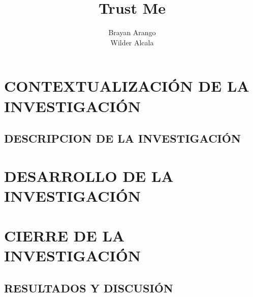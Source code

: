 \documentclass[12pt,letterpaper,oneside]{report}
\title{Trust Me}
\author{{Brayan Arango} \\ {Wilder Alcala}}
\begin{document}
	
	
	

	
	
	
	\tableofcontents
	
	
	
	\part{CONTEXTUALIZACIÓN DE LA INVESTIGACIÓN}
	
		\chapter{DESCRIPCION DE LA INVESTIGACIÓN}
			
			
			
			
			
			
			
			
	\part{DESARROLLO DE LA INVESTIGACIÓN}

			

	\part{CIERRE DE LA INVESTIGACIÓN}

		\chapter{RESULTADOS Y DISCUSIÓN}
\end{document}
